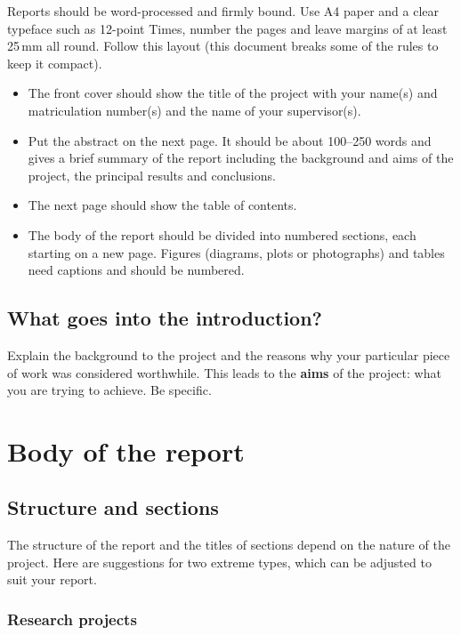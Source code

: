\documentclass[a4paper,12pt]{article}
\begin{document}
Reports should be word-processed and firmly bound. Use A4 paper and a clear typeface such as 12-point Times, number the pages and leave margins of at least 25\,mm all round. Follow this layout (this document breaks some of the rules to keep it compact).
\begin{itemize}
\item
The front cover should show the title of the project with your name(s) and matriculation number(s) and the name of your supervisor(s).
\item
Put the abstract on the next page. It should be about 100--250 words and gives a brief summary of the report including the background and aims of the project, the principal results and conclusions.
\item
The next page should show the table of contents. 
\item
The body of the report should be divided into numbered sections, each starting on a new page. Figures (diagrams, plots or photographs) and tables need captions and should be numbered.
\end{itemize}

\subsection{What goes into the introduction?}

Explain the background to the project and the reasons why your particular piece of work was considered worthwhile. This leads to the \textbf{aims} of the project: what you are trying to achieve. Be specific.


\section{Body of the report}

\subsection{Structure and sections}

The structure of the report and the titles of sections depend on the nature of the project. Here are suggestions for two extreme types, which can be adjusted to suit your report.

\subsubsection{Research projects}
\end{document}
